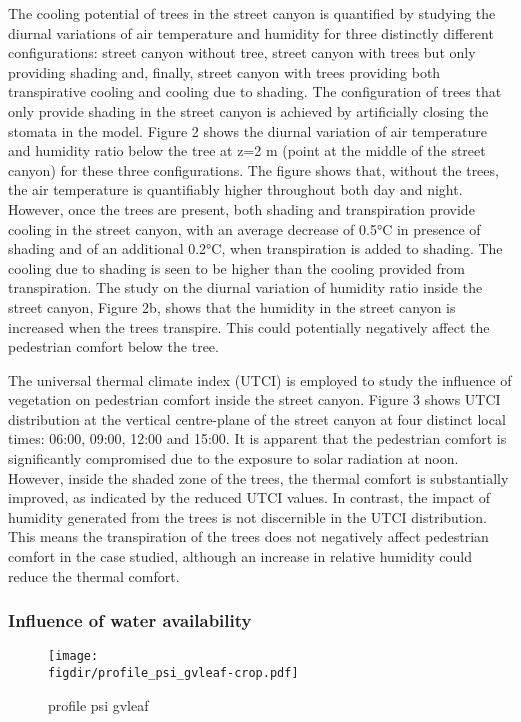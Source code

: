 The cooling potential of trees in the street canyon is quantified by studying the diurnal variations of air temperature and humidity for three distinctly different configurations: street canyon without tree, street canyon with trees but only providing shading and, finally, street canyon with trees providing both transpirative cooling and cooling due to shading. The configuration of trees that only provide shading in the street canyon is achieved by artificially closing the stomata in the model. Figure 2 shows the diurnal variation of air temperature and humidity ratio below the tree at z=2 m (point at the middle of the street canyon) for these three configurations. The figure shows that, without the trees, the air temperature is quantifiably higher throughout both day and night. However, once the trees are present, both shading and transpiration provide cooling in the street canyon, with an average decrease of 0.5°C in presence of shading and of an additional 0.2°C, when transpiration is added to shading. The cooling due to shading is seen to be higher than the cooling provided from transpiration. The study on the diurnal variation of humidity ratio inside the street canyon, Figure 2b, shows that the humidity in the street canyon is increased when the trees transpire. This could potentially negatively affect the pedestrian comfort below the tree. 

The universal thermal climate index (UTCI) is employed to study the influence of vegetation on pedestrian comfort inside the street canyon. Figure 3 shows UTCI distribution at the vertical centre-plane of the street canyon at four distinct local times: 06:00, 09:00, 12:00 and 15:00. It is apparent that the pedestrian comfort is significantly compromised due to the exposure to solar radiation at noon. However, inside the shaded zone of the trees, the thermal comfort is substantially improved, as indicated by the reduced UTCI values. In contrast, the impact of humidity generated from the trees is not discernible in the UTCI distribution. This means the transpiration of the trees does not negatively affect pedestrian comfort in the case studied, although an increase in relative humidity could reduce the thermal comfort.


\subsubsection*{Influence of water availability}



\begin{figure}[p]
	\centering
	\texttt{[image: \\figdir/profile\_psi\_gvleaf-crop.pdf]}
	\caption{profile psi gvleaf}
	\label{fig:profile_psi_gvleaf}
\end{figure}


